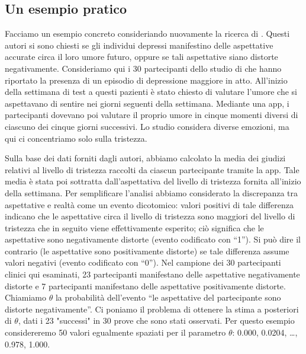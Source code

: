 \subsection{Un esempio pratico}
\label{sec:es_pratico_zetsche}

Facciamo un esempio concreto consideriando nuovamente la ricerca di \citet{zetsche_future_2019}.
Questi autori si sono chiesti se gli individui depressi manifestino delle aspettative accurate circa il loro umore futuro, oppure se tali aspettative siano distorte negativamente.
Consideriamo qui i 30 partecipanti dello studio di \citet{zetsche_future_2019} che hanno riportato la presenza di un episodio di depressione maggiore in atto.
All'inizio della settimana di test a questi pazienti è stato chiesto di valutare l'umore che si aspettavano di sentire nei giorni seguenti della settimana.
Mediante una app, i partecipanti dovevano poi valutare il proprio umore in cinque momenti diversi di ciascuno dei cinque giorni successivi.
Lo studio considera diverse emozioni, ma qui ci concentriamo solo sulla tristezza.

Sulla base dei dati forniti dagli autori, abbiamo calcolato la media dei giudizi  relativi al livello di tristezza raccolti da ciascun partecipante tramite la app.
Tale media è stata poi sottratta dall'aspettativa del livello di tristezza fornita all'inizio della settimana.
Per semplificare l'analisi abbiamo considerato la discrepanza tra aspettative e realtà come un evento dicotomico: valori positivi di tale differenza indicano che le aspettative circa il livello di tristezza sono maggiori del livello di tristezza che in seguito viene effettivamente esperito; ciò significa che le aspettative sono negativamente distorte (evento codificato con \enquote{1}).
Si può dire il contrario (le aspettative sono positivamente distorte) se tale differenza assume valori negativi (evento codificato con \enquote{0}).
Nel campione dei 30 partecipanti clinici qui esaminati, 23 partecipanti manifestano delle aspettative negativamente distorte e 7 partecipanti manifestano delle aspettative positivamente distorte.
Chiamiamo $\theta$ la probabilità dell'evento \enquote{le aspettative del partecipante sono distorte negativamente}. 
Ci poniamo il problema di ottenere la stima a posteriori di $\theta$, dati i 23 "successi" in 30 prove che sono stati osservati.
Per questo esempio considereremo 50 valori egualmente spaziati per il parametro $\theta$: 0.000, 0.0204, \dots, 0.978, 1.000.

